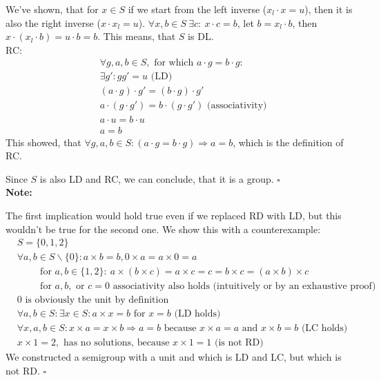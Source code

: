\documentclass[a4paper]{article}
\begin{document}
We've shown, that for $x \in S$ if we start from the left inverse ($x_l\cdot x = u$), then it is also the right inverse ($x\cdot x_l = u$). $\forall x, b\in S\ \exists c:\ x\cdot c = b$, let $b=x_l\cdot b$, then $x\cdot (x_l \cdot b) = u\cdot b = b$. This means, that $S$ is DL.\\

RC:
\begin{align*}
 & \forall g, a, b \in S, \text{ for which } a\cdot g = b\cdot g: \\
 & \exists g': gg' = u \text{ (LD)} \\
 & (a\cdot g)\cdot g' = (b\cdot g)\cdot g' \\
 & a\cdot(g\cdot g') = b\cdot (g\cdot g') \text { (associativity)} \\
 & a\cdot u = b \cdot u \\
 & a = b 
\end{align*}
This showed, that $\forall g, a, b \in S: (a\cdot g = b\cdot g) \Rightarrow a = b$, which is the definition of RC.

Since $S$ is also LD and RC, we can conclude, that it is a group. $\square$ \\
    
\textbf{Note:}

The first implication would hold true even if we replaced RD with LD, but this wouldn't be true for the second one. We show this with a counterexample: 
\begin{align*}
 & S = \{0, 1, 2\} \\
 & \forall a, b \in S \backslash \{0\}: a\times b = b, 0\times a = a \times 0 = a\\
 & \hspace{1cm} \text{for } a, b \in \{1,2\}:\ a\times (b\times c) = a\times c = c = b\times c = (a\times b)\times c\\
 & \hspace{1cm} \text{for } a, b, \text{ or } c = 0 \text{ associativity also holds (intuitively or by an exhaustive proof)} \\
 & 0 \text{ is obviously the unit by definition} \\
 & \forall a, b \in S: \exists x \in S: a\times x = b \text{ for } x = b \text{ (LD holds)} \\
 & \forall x, a, b \in S: x\times a = x\times b \Rightarrow a = b \text { because } x\times a = a \text{ and } x\times b = b \text{ (LC holds)} \\
 & x \times 1 = 2, \text{ has no solutions, because } x \times 1 = 1 \text{ (is not RD)}
\end{align*}
We constructed a semigroup with a unit and which is LD and LC, but which is not RD. $\square$
\end{document}
